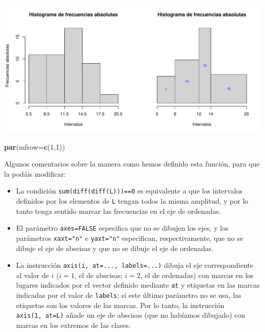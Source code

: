\documentclass[
]{book}
\newenvironment{Shaded}{\begin{snugshade}}{\end{snugshade}}
\newcommand{\DataTypeTok}[1]{\textcolor[rgb]{0.13,0.29,0.53}{#1}}
\newcommand{\DecValTok}[1]{\textcolor[rgb]{0.00,0.00,0.81}{#1}}
\newcommand{\KeywordTok}[1]{\textcolor[rgb]{0.13,0.29,0.53}{\textbf{#1}}}
\newcommand{\NormalTok}[1]{#1}
\theoremstyle{definition}
\theoremstyle{definition}
\theoremstyle{definition}
\theoremstyle{remark}
\begin{document}
\begin{center}\includegraphics[width=0.9\linewidth]{13chap13_Agrupados_files/figure-latex/unnamed-chunk-72-1} \end{center}

\begin{Shaded}
\begin{Highlighting}[]
\KeywordTok{par}\NormalTok{(}\DataTypeTok{mfrow=}\KeywordTok{c}\NormalTok{(}\DecValTok{1}\NormalTok{,}\DecValTok{1}\NormalTok{))}
\end{Highlighting}
\end{Shaded}

Algunos comentarios sobre la manera como hemos definido esta función, para que la podáis modificar:

\begin{itemize}
\item
  La condición \texttt{sum(diff(diff(L)))==0} es equivalente a que los intervalos definidos por los elementos de \texttt{L} tengan todos la misma amplitud, y por lo tanto tenga sentido marcar las frecuencias en el eje de ordenadas.
\item
  El parámetro \texttt{axes=FALSE} especifica que no se dibujen los ejes, y los parámetros \texttt{xaxt="n"} e \texttt{yaxt="n"} especifican, respectivamente, que no se dibuje el eje de abscisas y que no se dibuje el eje de ordenadas.
\item
  La instrucción \texttt{axis(i,\ at=...,\ labels=...)} dibuja el eje correspondiente al valor de \(i\) (\(i=1\), el de abscisas; \(i=2\), el de ordenadas) con marcas en los lugares indicados por el vector definido mediante \texttt{at} y etiquetas en las marcas indicadas por el valor de \texttt{labels}; si este último parámetro no se usa, las etiquetas son los valores de las marcas. Por lo tanto, la instrucción \texttt{axis(1,\ at=L)} añade un eje de abscisas (que no habíamos dibujado) con marcas en los extremos de las clases.
\end{itemize}
\end{document}
